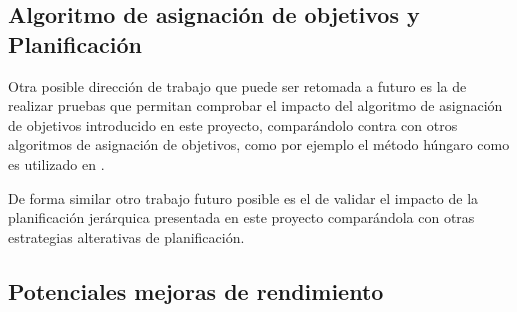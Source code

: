 







\subsection[Algoritmo de asignación de objetivos y Planificación]{Algoritmo de asignación de objetivos y\\ Planificación}

Otra posible dirección de trabajo que puede ser retomada a futuro es la de
realizar pruebas que permitan comprobar el impacto del algoritmo de asignación
de objetivos introducido en este proyecto, comparándolo contra con otros algoritmos de
asignación de objetivos, como por ejemplo el método húngaro como es utilizado
en \cite{wurm2008coordinated}.

De forma similar otro trabajo futuro posible es el de validar el impacto de la
planificación jerárquica presentada en este proyecto comparándola con otras
estrategias alterativas de planificación. 

\subsection{Potenciales mejoras de rendimiento}

